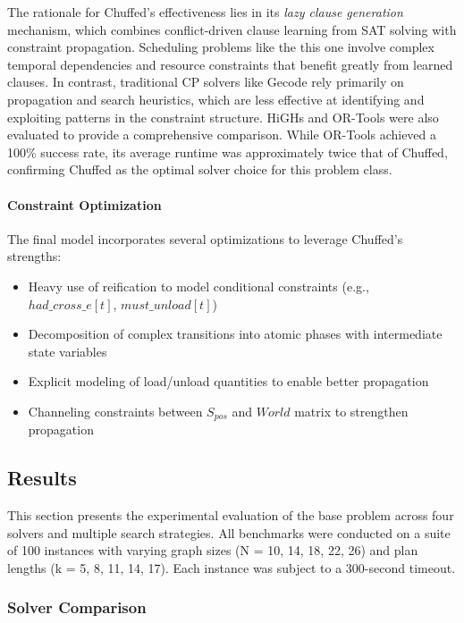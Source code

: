\documentclass[a4paper,12pt]{article}
\begin{document}
The rationale for Chuffed's effectiveness lies in its \textit{lazy clause generation} mechanism, which combines conflict-driven clause learning from SAT solving with constraint propagation. Scheduling problems like the this one involve complex temporal dependencies and resource constraints that benefit greatly from learned clauses. In contrast, traditional CP solvers like Gecode rely primarily on propagation and search heuristics, which are less effective at identifying and exploiting patterns in the constraint structure. HiGHs and OR-Tools were also evaluated to provide a comprehensive comparison. While OR-Tools achieved a 100\% success rate, its average runtime was approximately twice that of Chuffed, confirming Chuffed as the optimal solver choice for this problem class.

\paragraph{Constraint Optimization}
The final model incorporates several optimizations to leverage Chuffed's strengths:
\begin{itemize}
    \item Heavy use of reification to model conditional constraints (e.g., $had\_cross\_e[t]$, $must\_unload[t]$)
    \item Decomposition of complex transitions into atomic phases with intermediate state variables
    \item Explicit modeling of load/unload quantities to enable better propagation
    \item Channeling constraints between $S_{pos}$ and $World$ matrix to strengthen propagation
\end{itemize}

\subsection{Results}

This section presents the experimental evaluation of the base problem across four solvers and multiple search strategies. All benchmarks were conducted on a suite of 100 instances with varying graph sizes (N = 10, 14, 18, 22, 26) and plan lengths (k = 5, 8, 11, 14, 17). Each instance was subject to a 300-second timeout.

\subsubsection{Solver Comparison}
\end{document}
